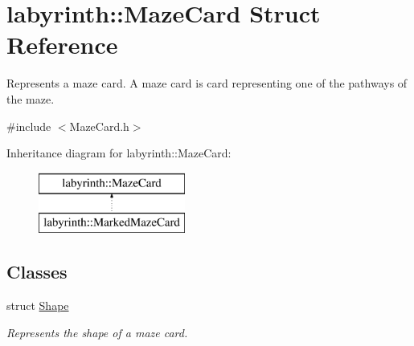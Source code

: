 \hypertarget{structlabyrinth_1_1_maze_card}{}\section{labyrinth\+::Maze\+Card Struct Reference}
\label{structlabyrinth_1_1_maze_card}


Represents a maze card. A maze card is card representing one of the pathways of the maze.  




{\ttfamily \#include $<$Maze\+Card.\+h$>$}

Inheritance diagram for labyrinth\+::Maze\+Card\+:\begin{figure}[H]
\begin{center}
\leavevmode
\includegraphics[height=2.000000cm]{structlabyrinth_1_1_maze_card}
\end{center}
\end{figure}
\subsection*{Classes}
\begin{DoxyCompactItemize}
\item 
struct \mbox{\hyperlink{structlabyrinth_1_1_maze_card_1_1_shape}{Shape}}
\begin{DoxyCompactList}\small\item\em Represents the shape of a maze card. \end{DoxyCompactList}\end{DoxyCompactItemize}
